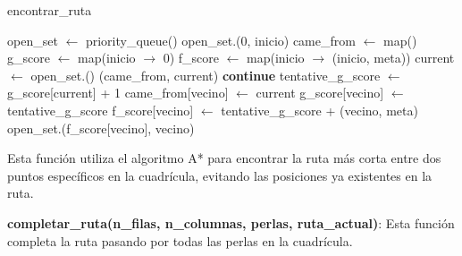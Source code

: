 \documentclass{article}
\begin{document}
\begin{algorithm}[H]
\caption{encontrar\_ruta}
\begin{algorithmic}[1]
    \State open\_set $\leftarrow$ priority\_queue()
    \State open\_set.(0, inicio)
    \State came\_from $\leftarrow$ map()
    \State g\_score $\leftarrow$ map(inicio $\rightarrow$ 0)
    \State f\_score $\leftarrow$ map(inicio $\rightarrow$ (inicio, meta))
        \State current $\leftarrow$ open\_set.()
            \State \Return {}(came\_from, current)
        \EndIf
                \State \textbf{continue}
            \EndIf
            \State tentative\_g\_score $\leftarrow$ g\_score[current] + 1
                \State came\_from[vecino] $\leftarrow$ current
                \State g\_score[vecino] $\leftarrow$ tentative\_g\_score
                \State f\_score[vecino] $\leftarrow$ tentative\_g\_score + (vecino, meta)
                \State open\_set.(f\_score[vecino], vecino)
            \EndIf
        \EndFor
    \EndWhile
    \State \Return {} 
\EndProcedure
\end{algorithmic}
\end{algorithm}

Esta función utiliza el algoritmo A* para encontrar la ruta más corta entre dos puntos específicos en la cuadrícula, evitando las posiciones ya existentes en la ruta.

\textbf{completar\_ruta(n\_filas, n\_columnas, perlas, ruta\_actual)}: Esta función completa la ruta pasando por todas las perlas en la cuadrícula.
\end{document}
